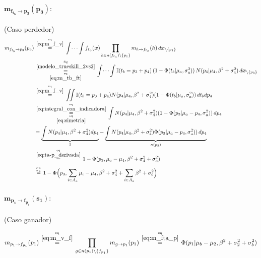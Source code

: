 \documentclass[article]{jss}
\newcommand\hfrac[2]{\genfrac{}{}{0pt}{}{#1}{#2}} %
\begin{document}
\begin{appendix}
\paragraph{$\bm{m_{f_{t_b} \rightarrow p_3}(p_3)}:$} (Caso perdedor)
\begin{equation}\label{eq:m_ftb_p}
\begin{split}
m_{f_{t_b} \rightarrow p_3}(p_3)&\overset{\hfrac{\text{eq}}{\ref{eq:m_f_v}}}{=} \int \dots \int f_{t_a}(\bm{x}) \prod_{h \in n(f_{t_a}) \setminus \{p_1\} } m_{h \rightarrow f_{t_a}}(h) \, d\bm{x}_{\setminus \{p_1\} }  \\
&\overset{\hfrac{\text{fig}}{\ref{modelo_trueskill_2vs2}}}{\underset{\hfrac{\text{eq}}{\ref{eq:m_tb_ft}}}{=}} \int \dots \int \mathbb{I}( t_b = p_3 + p_4) \, (1-\Phi (t_b| \mu_a , \sigma_a^2 )) \, N(p_4| \mu_4, \beta^2 + \sigma_4^2 ) \, d\bm{x}_{\setminus \{p_3\} }\\[0.1cm]
&\overset{\hfrac{\text{eq}}{\ref{eq:m_f_v}}}{=} \iint \mathbb{I}( t_b = p_3 + p_4) N(p_4| \mu_4, \beta^2 + \sigma_4^2 )  (1 - \Phi (t_b| \mu_a , \sigma_a^2) )\, dt_b dp_4 \\
&\overset{\hfrac{\text{eq}}{\ref{eq:integral_con_indicadora}}}{\underset{\hfrac{\text{eq}}{\ref{eq:simetria}}}{=}} \int N(p_4| \mu_4, \beta^2 + \sigma_4^2 )  (1 - \Phi (p_3 | \mu_a - p_4 , \sigma_a^2 ) ) \,  dp_4 \\
& =  \underbrace{\int N(p_4| \mu_4, \beta^2 + \sigma_4^2 )dp_4}_{1}  -  \underbrace{\int N(p_4| \mu_4, \beta^2 + \sigma_4^2 ) \Phi (p_3 | \mu_a - p_4 , \sigma_a^2 ) ) \, dp_4}_{\kappa(p_3)} \\
&\overset{\hfrac{\text{eq}}{\ref{eq:ta-p_derivada}}}{=} 1 - \Phi(p_3, \mu_a  - \mu_4, \beta^2 + \sigma_4^2 + \sigma_a^2)\\[0.1cm]
&\overset{\hfrac{\mu_a}{\sigma_a}}{=} 1 - \Phi\Big(p_3, \sum_{i \in A_a} \mu_i  - \mu_4, \beta^2 + \sigma_4^2 + \sum_{i \in A_a} \beta^2 + \sigma_i^2  \Big)
\end{split}
\end{equation}

\paragraph{$\bm{m_{p_1 \rightarrow f_{p_1}}(s_1)}:$} (Caso ganador)

\begin{equation}\label{eq:m_p1_fp}
\begin{split}
 m_{p_1 \rightarrow f_{p_1}}(p_1) \overset{\hfrac{\text{eq}}{\ref{eq:m_v_f}}}{=} \prod_{g \in n(p_1) \setminus  \{f_{p_1} \}} m_{g \rightarrow p_1} (p_1)  \overset{\hfrac{\text{eq}}{\ref{eq:m_fta_p}}}{=}  \Phi(p_1| \mu_b - \mu_2, \beta^2 + \sigma_2^2 + \sigma_b^2) 
\end{split}
\end{equation}



\end{appendix}
\end{document}
